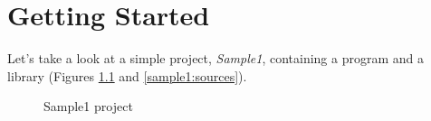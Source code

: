 \documentclass[a4paper]{article}
\begin{document}

\chapter{Getting Started}

Let's take a look at a simple project, \emph{Sample1}, containing a program and a library (Figures \ref{sample1:project.1} and \ref{sample1:sources}).

\begin{figure}[h]
\caption{\label{sample1:project.1}Sample1 project}
\begin{center}\end{center}
\end{figure}
\end{document}

